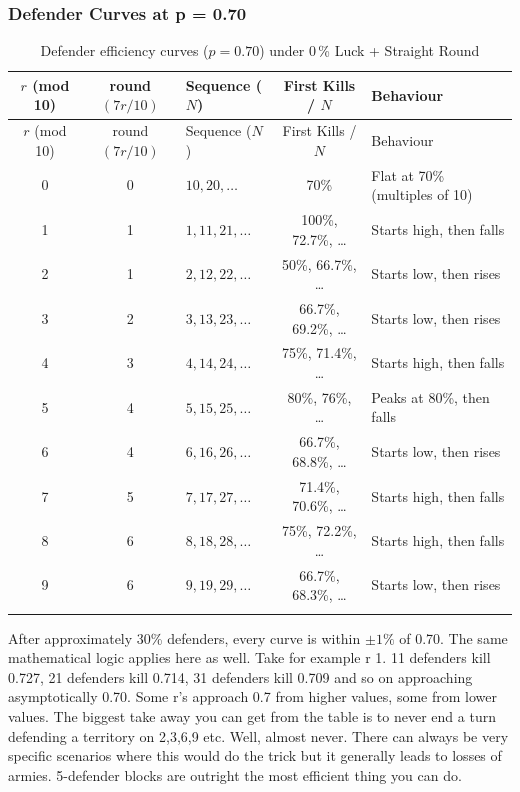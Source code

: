\subsubsection{Defender Curves at p = 0.70}

\small
\begin{longtable}{|c|c|l|c|l|}
\hline
\rowcolor{Baby_Blue}
$r$ (mod 10) & round$(7r/10)$ & Sequence ($N$) & First Kills / $N$ & Behaviour \\ 
\hline\hline
\endfirsthead
\hline
\rowcolor{Baby_Blue}
$r$ (mod 10) & round$(7r/10)$ & Sequence ($N$) & First Kills / $N$ & Behaviour \\ 
\hline\hline
\endhead
0 & 0 & $10,20,\dots$ & 70\% & Flat at 70\% (multiples of 10) \\ \hline
1 & 1 & $1,11,21,\dots$ & 100\%, 72.7\%, \dots & Starts high, then falls \\ \hline
2 & 1 & $2,12,22,\dots$ & 50\%, 66.7\%, \dots & Starts low, then rises \\ \hline
3 & 2 & $3,13,23,\dots$ & 66.7\%, 69.2\%, \dots & Starts low, then rises \\ \hline
4 & 3 & $4,14,24,\dots$ & 75\%, 71.4\%, \dots & Starts high, then falls \\ \hline
5 & 4 & $5,15,25,\dots$ & 80\%, 76\%, \dots & Peaks at 80\%, then falls \\ \hline
6 & 4 & $6,16,26,\dots$ & 66.7\%, 68.8\%, \dots & Starts low, then rises \\ \hline
7 & 5 & $7,17,27,\dots$ & 71.4\%, 70.6\%, \dots & Starts high, then falls \\ \hline
8 & 6 & $8,18,28,\dots$ & 75\%, 72.2\%, \dots & Starts high, then falls \\ \hline
9 & 6 & $9,19,29,\dots$ & 66.7\%, 68.3\%, \dots & Starts low, then rises \\ \hline
\caption{Defender efficiency curves ($p = 0.70$) under 0\,\% Luck + Straight Round}
\label{table:defenderResidue}
\end{longtable}
\normalsize

After approximately 30\% defenders, every curve is within $\pm 1\%$ of 0.70. The same mathematical logic applies here as well. Take for example r 1. 11 defenders kill 0.727, 21 defenders kill 0.714, 31 defenders kill 0.709 and so on approaching asymptotically 0.70. Some r's approach 0.7 from higher values, some from lower values. The biggest take away you can get from the table is to never end a turn defending a territory on 2,3,6,9 etc. Well, almost never. There can always be very specific scenarios where this would do the trick but it generally leads to losses of armies. 5-defender blocks are outright the most efficient thing you can do. 

